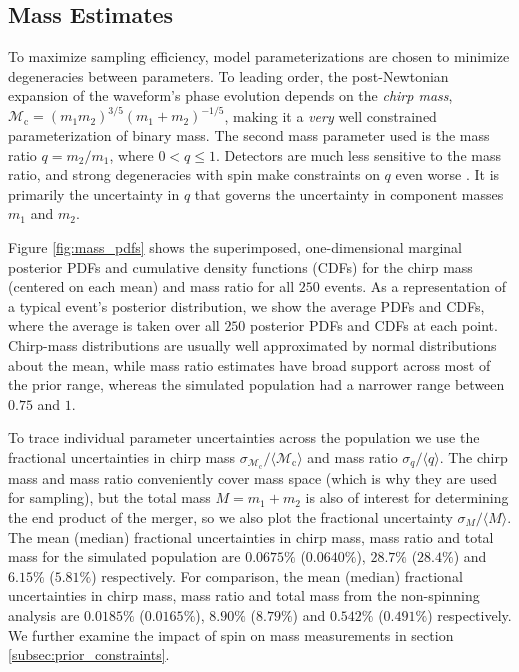 \subsection{Mass Estimates}\label{sec:mass}
To maximize sampling efficiency, model parameterizations are chosen to minimize degeneracies between parameters.  To leading order, the post-Newtonian expansion of the waveform's phase evolution depends on the \emph{chirp mass}, $\mathcal{M}_\mathrm{c} = (m_1 m_2)^{3/5} (m_1 + m_2)^{-1/5}$, making it a \emph{very} well constrained parameterization of binary mass.  The second mass parameter used is the mass ratio $q = m_2/m_1$, where $0 < q \leq 1$.  Detectors are much less sensitive to the mass ratio, and strong degeneracies with spin make constraints on $q$ even worse \citep{Cutler_1994}.  It is primarily the uncertainty in $q$ that governs the uncertainty in component masses $m_1$ and $m_2$.

Figure \ref{fig:mass_pdfs} shows the superimposed, one-dimensional marginal posterior PDFs and cumulative density functions (CDFs) for the chirp mass (centered on each mean) and mass ratio for all $250$ events.  As a representation of a typical event's posterior distribution, we show the average PDFs and CDFs, where the average is taken over all $250$ posterior PDFs and CDFs at each point. Chirp-mass distributions are usually well approximated by normal distributions about the mean, while mass ratio estimates have broad support across most of the prior range, whereas the simulated population had a narrower range between $0.75$ and $1$.

To trace individual parameter uncertainties across the population we use the fractional uncertainties in chirp mass $\sigma_{\mathcal{M}_\mathrm{c}}/\langle\mathcal{M}_\mathrm{c}\rangle$ and mass ratio $\sigma_q/\langle q\rangle$. The chirp mass and mass ratio conveniently cover mass space (which is why they are used for sampling), but the total mass $M = m_1 + m_2$ is also of interest for determining the end product of the merger, so we also plot the fractional uncertainty $\sigma_M/\langle M\rangle$. The mean (median) fractional uncertainties in chirp mass, mass ratio and total mass for the simulated population are $0.0675\%$ ($0.0640\%$), $28.7\%$ ($28.4\%$) and $6.15\%$ ($5.81\%$) respectively. For comparison, the mean (median) fractional uncertainties  in chirp mass, mass ratio and total mass from the non-spinning analysis are $0.0185\%$ ($0.0165\%$), $8.90\%$ ($8.79\%$) and $0.542\%$ ($0.491\%$) respectively.  We further examine the impact of spin on mass measurements in section \ref{subsec:prior_constraints}.

